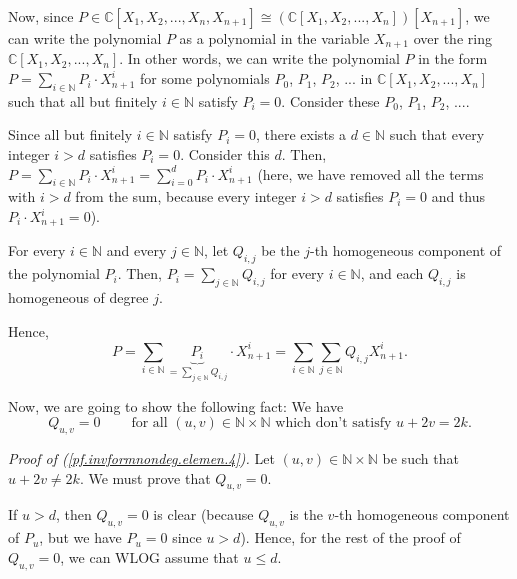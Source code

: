 \documentclass
[numbers=enddot,12pt,final,onecolumn,german,notitlepage]{scrartcl}%
\theoremstyle{definition}
\begin{document}
Now, since $P\in\mathbb{C}\left[  X_{1},X_{2},...,X_{n},X_{n+1}\right]
\cong\left(  \mathbb{C}\left[  X_{1},X_{2},...,X_{n}\right]  \right)  \left[
X_{n+1}\right]  $, we can write the polynomial $P$ as a polynomial in the
variable $X_{n+1}$ over the ring $\mathbb{C}\left[  X_{1},X_{2},...,X_{n}%
\right]  $. In other words, we can write the polynomial $P$ in the form
$P=\sum\limits_{i\in\mathbb{N}}P_{i}\cdot X_{n+1}^{i}$ for some polynomials
$P_{0}$, $P_{1}$, $P_{2}$, $...$ in $\mathbb{C}\left[  X_{1},X_{2}%
,...,X_{n}\right]  $ such that all but finitely $i\in\mathbb{N}$ satisfy
$P_{i}=0$. Consider these $P_{0}$, $P_{1}$, $P_{2}$, $...$.

Since all but finitely $i\in\mathbb{N}$ satisfy $P_{i}=0$, there exists a
$d\in\mathbb{N}$ such that every integer $i>d$ satisfies $P_{i}=0$. Consider
this $d$. Then, $P=\sum\limits_{i\in\mathbb{N}}P_{i}\cdot X_{n+1}^{i}%
=\sum\limits_{i=0}^{d}P_{i}\cdot X_{n+1}^{i}$ (here, we have removed all the
terms with $i>d$ from the sum, because every integer $i>d$ satisfies $P_{i}=0$
and thus $P_{i}\cdot X_{n+1}^{i}=0$).

For every $i\in\mathbb{N}$ and every $j\in\mathbb{N}$, let $Q_{i,j}$ be the
$j$-th homogeneous component of the polynomial $P_{i}$. Then, $P_{i}%
=\sum\limits_{j\in\mathbb{N}}Q_{i,j}$ for every $i\in\mathbb{N}$, and each
$Q_{i,j}$ is homogeneous of degree $j$.

Hence,%
\begin{equation}
P=\sum\limits_{i\in\mathbb{N}}\underbrace{P_{i}}_{=\sum\limits_{j\in
\mathbb{N}}Q_{i,j}}\cdot X_{n+1}^{i}=\sum\limits_{i\in\mathbb{N}}%
\sum\limits_{j\in\mathbb{N}}Q_{i,j}X_{n+1}^{i}.
\label{pf.invformnondeg.elemen.3a}%
\end{equation}


Now, we are going to show the following fact: We have%
\begin{equation}
Q_{u,v}=0\ \ \ \ \ \ \ \ \ \ \text{for all }\left(  u,v\right)  \in
\mathbb{N}\times\mathbb{N}\text{ which don't satisfy }u+2v=2k.
\label{pf.invformnondeg.elemen.4}%
\end{equation}


\textit{Proof of (\ref{pf.invformnondeg.elemen.4}).} Let $\left(  u,v\right)
\in\mathbb{N}\times\mathbb{N}$ be such that $u+2v\neq2k$. We must prove that
$Q_{u,v}=0$.

If $u>d$, then $Q_{u,v}=0$ is clear (because $Q_{u,v}$ is the $v$-th
homogeneous component of $P_{u}$, but we have $P_{u}=0$ since $u>d$). Hence,
for the rest of the proof of $Q_{u,v}=0$, we can WLOG assume that $u\leq d$.
\end{document}
